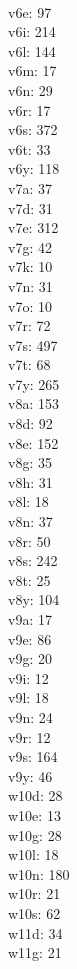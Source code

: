 \begin{multicols}{8}
  \\ v6e: 97
  \\ v6i: 214
  \\ v6l: 144
  \\ v6m: 17
  \\ v6n: 29
  \\ v6r: 17
  \\ v6s: 372
  \\ v6t: 33
  \\ v6y: 118
  \\ v7a: 37
  \\ v7d: 31
  \\ v7e: 312
  \\ v7g: 42
  \\ v7k: 10
  \\ v7n: 31
  \\ v7o: 10
  \\ v7r: 72
  \\ v7s: 497
  \\ v7t: 68
  \\ v7y: 265
  \\ v8a: 153
  \\ v8d: 92
  \\ v8e: 152
  \\ v8g: 35
  \\ v8h: 31
  \\ v8l: 18
  \\ v8n: 37
  \\ v8r: 50
  \\ v8s: 242
  \\ v8t: 25
  \\ v8y: 104
  \\ v9a: 17
  \\ v9e: 86
  \\ v9g: 20
  \\ v9i: 12
  \\ v9l: 18
  \\ v9n: 24
  \\ v9r: 12
  \\ v9s: 164
  \\ v9y: 46
  \\ w10d: 28
  \\ w10e: 13
  \\ w10g: 28
  \\ w10l: 18
  \\ w10n: 180
  \\ w10r: 21
  \\ w10s: 62
  \\ w11d: 34
  \\ w11g: 21

\end{multicols}
